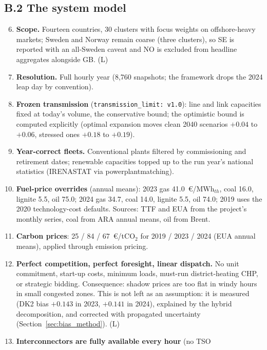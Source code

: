 \subsection*{B.2 The system model}

\begin{enumerate}\setcounter{enumi}{5}
    \item \textbf{Scope.} Fourteen countries, 30 clusters with focus
    weights on offshore-heavy markets; Sweden and Norway remain coarse
    (three clusters), so SE is reported with an all-Sweden caveat and NO is
    excluded from headline aggregates alongside GB. (L)
    \item \textbf{Resolution.} Full hourly year (8,760 snapshots; the
    framework drops the 2024 leap day by convention).
    \item \textbf{Frozen transmission} (\texttt{transmission\_limit: v1.0}):
    line and link capacities fixed at today's volume, the conservative
    bound; the optimistic bound is computed explicitly (optimal expansion
    moves clean 2040 scenarios $+0.04$ to $+0.06$, stressed ones $+0.18$ to
    $+0.19$).
    \item \textbf{Year-correct fleets.} Conventional plants filtered by
    commissioning and retirement dates; renewable capacities topped up to
    the run year's national statistics (IRENASTAT via powerplantmatching).
    \item \textbf{Fuel-price overrides} (annual means): 2023 gas
    41.0~\euro/MWh$_{th}$, coal 16.0, lignite 5.5, oil 75.0; 2024 gas 34.7,
    coal 14.0, lignite 5.5, oil 74.0; 2019 uses the 2020 technology-cost
    defaults. Sources: TTF and EUA from the project's monthly series, coal
    from ARA annual means, oil from Brent.
    \item \textbf{Carbon prices}: 25 / 84 / 67~\euro/tCO$_2$ for 2019 /
    2023 / 2024 (EUA annual means), applied through emission pricing.
    \item \textbf{Perfect competition, perfect foresight, linear
    dispatch.} No unit commitment, start-up costs, minimum loads, must-run
    district-heating CHP, or strategic bidding. Consequence: shadow prices
    are too flat in windy hours in small congested zones. This is not left
    as an assumption: it is measured (DK2 bias $+0.143$ in 2023, $+0.141$
    in 2024), explained by the hybrid decomposition, and corrected with
    propagated uncertainty (Section~\ref{sec:bias_method}). (L)
    \item \textbf{Interconnectors are fully available every hour} (no TSO

\end{enumerate}
